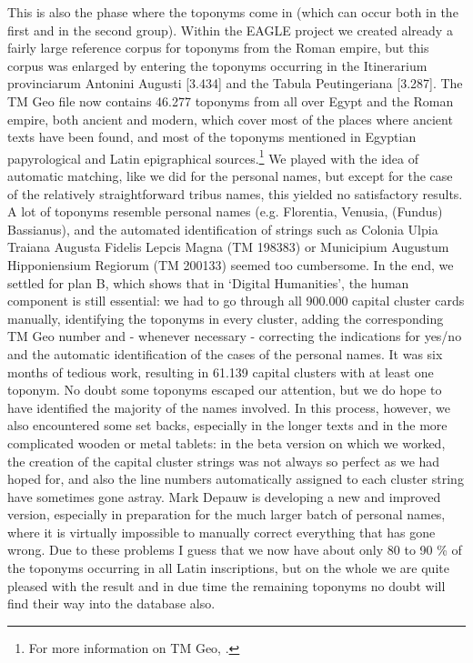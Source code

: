 \documentclass[amsthm,ebook]{saparticle}
\begin{document}
This is also the phase where the toponyms come in (which can occur both in the first and in the second group).
Within the EAGLE project we created already a fairly large reference corpus for toponyms from the Roman empire, but
this corpus was enlarged by entering the toponyms occurring in the Itinerarium provinciarum Antonini Augusti [3.434]
and the Tabula Peutingeriana [3.287]. The TM Geo file now contains 46.277 toponyms from all over Egypt and the Roman
empire, both ancient and modern, which cover most of the places where ancient texts have been found, and most of the
toponyms mentioned in Egyptian papyrological and Latin epigraphical sources.\footnote{ For more information on TM Geo,
\citep{verreth2013}.} We played with the idea of automatic matching, like we did for the personal
names, but except for the case of the relatively straightforward tribus names, this yielded no satisfactory results. A
lot of toponyms resemble personal names (e.g. Florentia, Venusia, (Fundus) Bassianus), and the automated identification
of strings such as Colonia Ulpia Traiana Augusta Fidelis Lepcis Magna (TM 198383) or Municipium Augustum Hipponiensium
Regiorum (TM 200133) seemed too cumbersome. In the end, we settled for plan B, which shows that in `Digital
Humanities', the human component is still essential: we had to go through all 900.000 capital cluster cards manually,
identifying the toponyms in every cluster, adding the corresponding TM Geo number and - whenever necessary - correcting
the indications for yes/no and the automatic identification of the cases of the personal names. It was six months of
tedious work, resulting in 61.139 capital clusters with at least one toponym. No doubt some toponyms escaped our
attention, but we do hope to have identified the majority of the names involved. In this process, however, we also
encountered some set backs, especially in the longer texts and in the more complicated wooden or metal tablets: in the
beta version on which we worked, the creation of the capital cluster strings was not always so perfect as we had hoped
for, and also the line numbers automatically assigned to each cluster string have sometimes gone astray. Mark Depauw is
developing a new and improved version, especially in preparation for the much larger batch of personal names, where it
is virtually impossible to manually correct everything that has gone wrong. Due to these problems I guess that we now
have about only 80 to 90 \% of the toponyms occurring in all Latin inscriptions, but on the whole we are quite pleased
with the result and in due time the remaining toponyms no doubt will find their way into the database also.
\end{document}
